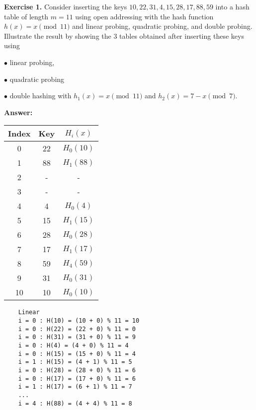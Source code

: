 \documentclass[11pt]{article}
\begin{document}
\textbf{Exercise 1.} Consider inserting the keys $10, 22, 31, 4, 15, 28, 17, 88, 59$ into a hash table of length $m=11$ using open addressing with the  hash function $h(x) = x \pmod{11}$ and linear probing, quadratic probing, and double probing. Illustrate  the result by showing the 3 tables obtained  after inserting these keys using 

$\bullet$ linear probing, 

$\bullet$ quadratic probing



$\bullet$ double hashing with $h_1(x) = x \pmod{11} $ and $h_2(x) = 7 - x \pmod{7}$.
  
\textbf{Answer:}
\newline
\begin{center}
\begin{tabular}{|c c c |} 
 \hline
 Index & Key & $H_i(x)$ \\ 
 \hline\hline
 0 & 22 &  $H_0(10)$ \\ 
\hline
 1 & 88 & $H_1(88)$ \\ 
 \hline
 2 & - & -  \\ 
 \hline
 3 & - & -  \\ 
 \hline
 4 & 4 & $H_0(4)$  \\ 
 \hline
 5 & 15 & $H_1(15)$  \\
  \hline
6 & 28 & $H_0(28)$  \\ 
 \hline
 7 & 17 & $H_1(17)$  \\ 
 \hline
 8 & 59 & $H_4(59)$   \\ 
 \hline
 9 & 31 & $H_0(31)$  \\
  \hline
10 & 10 & $H_0(10)$  \\
  \hline
\end{tabular}
\end{center}
\begin{verbatim}
    Linear 
    i = 0 : H(10) = (10 + 0) % 11 = 10 
    i = 0 : H(22) = (22 + 0) % 11 = 0 
    i = 0 : H(31) = (31 + 0) % 11 = 9
    i = 0 : H(4) = (4 + 0) % 11 = 4
    i = 0 : H(15) = (15 + 0) % 11 = 4
    i = 1 : H(15) = (4 + 1) % 11 = 5
    i = 0 : H(28) = (28 + 0) % 11 = 6
    i = 0 : H(17) = (17 + 0) % 11 = 6
    i = 1 : H(17) = (6 + 1) % 11 = 7
    ...
    i = 4 : H(88) = (4 + 4) % 11 = 8
    
\end{verbatim}
\end{document}

